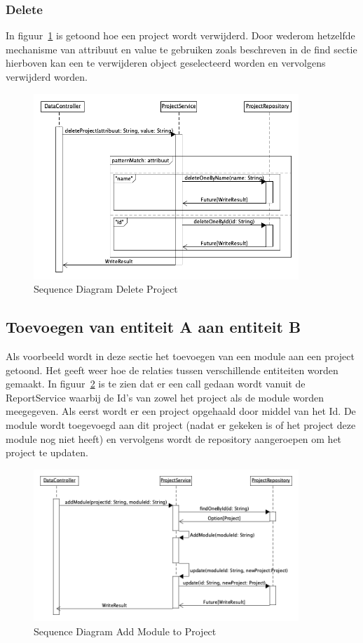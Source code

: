 \subsubsection*{Delete}
In figuur~\ref{fig:seqdiagDeleteProj} is getoond hoe een project wordt verwijderd. Door wederom hetzelfde mechanisme van attribuut en value te gebruiken zoals beschreven in de find sectie hierboven kan een te verwijderen object geselecteerd worden en vervolgens verwijderd worden.
\begin{figure}[h]
    \myfloatalign
    \includegraphics[width=10cm]{gfx/umlet/exports/CRUD-DeleteProject}
    \caption{Sequence Diagram Delete Project }
    \label{fig:seqdiagDeleteProj}
\end{figure}

\subsection{Toevoegen van entiteit A aan entiteit B}\label{subsec:toevoegen-van-entiteit-a-aan-entiteit-b}
Als voorbeeld wordt in deze sectie het toevoegen van een module aan een project getoond. Het geeft weer hoe de relaties tussen verschillende entiteiten worden gemaakt. In figuur~\ref{fig:seqdiagModToProj} is te zien dat er een call
gedaan wordt vanuit de ReportService waarbij de Id's van zowel het project als de module worden meegegeven. Als eerst wordt er een project opgehaald door middel van het Id. De module wordt toegevoegd aan dit project (nadat er gekeken is of het project deze module nog niet heeft) en vervolgens wordt de repository aangeroepen om het project te updaten.
\begin{figure}[h]
    \myfloatalign
    \includegraphics[width=10cm]{gfx/umlet/exports/Relation-ModuleToProject}
    \caption{Sequence Diagram Add Module to Project }
    \label{fig:seqdiagModToProj}
\end{figure}
\newpage
